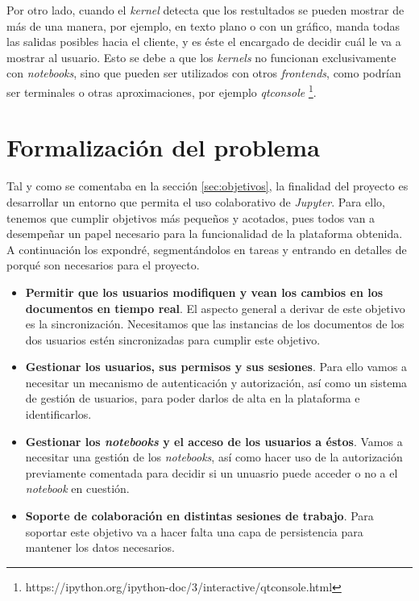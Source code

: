 \documentclass[11pt,spanish,listoffigures]{tfgetsinf}
\begin{document}
Por otro lado, cuando el \textit{kernel} detecta que los restultados se pueden mostrar de más de una manera, por ejemplo, en texto plano o con un gráfico, manda todas las salidas posibles hacia el cliente, y es éste el encargado de decidir cuál le va a mostrar al usuario. Esto se debe a que los \textit{kernels} no funcionan exclusivamente con \textit{notebooks}, sino que pueden ser utilizados con otros \textit{frontends}, como podrían ser terminales o otras aproximaciones, por ejemplo \textit{qtconsole} \footnote{https://ipython.org/ipython-doc/3/interactive/qtconsole.html}.



\section{Formalización del problema}
\label{sec:formalizacion}

Tal y como se comentaba en la sección \ref{sec:objetivos}, la finalidad del proyecto es desarrollar un entorno que permita el uso colaborativo de \textit{Jupyter}. Para ello, tenemos que cumplir objetivos más pequeños y acotados, pues todos van a desempeñar un papel necesario para la funcionalidad de la plataforma obtenida. A continuación los expondré, segmentándolos en tareas y entrando en detalles de porqué son necesarios para el proyecto.

\begin{itemize}

\item \textbf{Permitir que los usuarios modifiquen y vean los cambios en los documentos en tiempo real}. El aspecto general a derivar de este objetivo es la sincronización. Necesitamos que las instancias de los documentos de los dos usuarios estén sincronizadas para cumplir este objetivo.

\item \textbf{Gestionar los usuarios, sus permisos y sus sesiones}. Para ello vamos a necesitar un mecanismo de autenticación y autorización, así como un sistema de gestión de usuarios, para poder darlos de alta en la plataforma e identificarlos.

\item \textbf{Gestionar los \textit{notebooks} y el acceso de los usuarios a éstos}. Vamos a necesitar una gestión de los \textit{notebooks}, así como hacer uso de la autorización previamente comentada para decidir si un unuasrio puede acceder o no a el \textit{notebook} en cuestión.

\item \textbf{Soporte de colaboración en distintas sesiones de trabajo}. Para soportar este objetivo va a hacer falta una capa de persistencia para mantener los datos necesarios.
\end{itemize}
\end{document}
